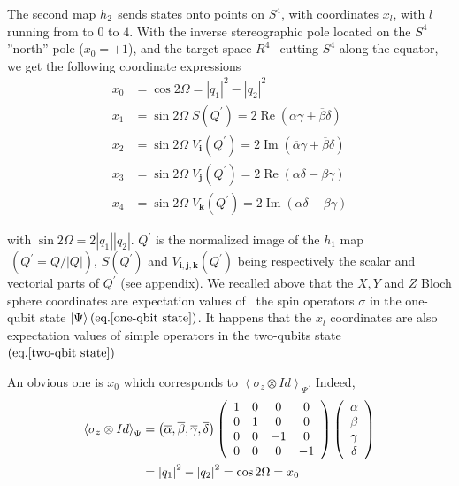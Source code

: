 \documentclass{amsart}
\begin{document}
The second map $h_{2\text{ }}$sends states onto points on $S^{4}$, with
coordinates $x_{l}$, with $l$ running from to $0$ to $4$. With the inverse
stereographic pole located on the $S^{4}$ ''north'' pole ($x_{0}=+1$), and the
target space $R^{4\text{ }}$ cutting $S^{4}$ along the equator, we get the
following coordinate expressions%
\begin{align}
x_{0}  &  =\cos2\Omega=\left|  q_{1}\right|  ^{2}-\left|  q_{2}\right|  ^{2}\\
x_{1}  &  =\sin2\Omega\;S(Q^{\prime})=2\operatorname{Re}\left(  \overline
{\alpha}\gamma+\overline{\beta}\delta\right) \nonumber\\
x_{2}  &  =\sin2\Omega\;V_{\mathbf{i}}(Q^{\prime})=2\operatorname{Im}\left(
\overline{\alpha}\gamma+\overline{\beta}\delta\right) \nonumber\\
x_{3}  &  =\sin2\Omega\;V_{\mathbf{j}}(Q^{\prime})=2\operatorname{Re}\left(
\alpha\delta-\beta\gamma\right) \nonumber\\
x_{4}  &  =\sin2\Omega\;V_{\mathbf{k}}(Q^{\prime})=2\operatorname{Im}\left(
\alpha\delta-\beta\gamma\right) \nonumber
\end{align}

with $\sin2\Omega=2\left|  q_{1}\right|  \left|  q_{2}\right|  $. $Q^{\prime}$
is the normalized image of the $h_{1}$ map $\ (Q^{\prime}=Q/\left|  Q\right|
)$, $S(Q^{\prime})$ and $V_{\mathbf{i},\mathbf{j},\mathbf{k}}(Q^{\prime})$
being respectively the scalar and vectorial parts of $Q^{\prime}$ (see
appendix). We recalled above that the $X,Y$ and $Z$ Bloch sphere coordinates
are expectation values of \ the spin operators $\sigma$ in the one-qubit state
$\left|  \Psi\right\rangle \left(  \text{eq.}\ref{one-qbit state}\right)  $.
It happens that the $x_{l}$ coordinates are also expectation values of simple
operators in the two-qubits state $\left(  \text{eq.}\ref{two-qbit
state}\right)  $

An obvious one is $x_{0}$ which corresponds to $\left\langle \sigma_{z}\otimes
Id\right\rangle _{\Psi}$. Indeed,%
\begin{align}
\left\langle \sigma_{z}\otimes Id\right\rangle _{\Psi}  &  =\left(
\overline{\alpha},\overline{\beta},\overline{\gamma},\overline{\delta}\right)
\left(
\begin{array}
[c]{cccc}%
1 & 0 & 0 & 0\\
0 & 1 & 0 & 0\\
0 & 0 & -1 & 0\\
0 & 0 & 0 & -1
\end{array}
\right)  \left(
\begin{array}
[c]{c}%
\alpha\\
\beta\\
\gamma\\
\delta
\end{array}
\right) \\
&  =\left|  q_{1}\right|  ^{2}-\left|  q_{2}\right|  ^{2}=\cos2\Omega
=x_{0}\nonumber
\end{align}
\end{document}
